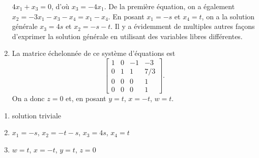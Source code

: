 \begin{exercice}
\begin{sol}
\begin{enumerate}
      $4x_1 + x_3 = 0$, d'où $x_3 = -4 x_1$. De la première équation,
      on a également $x_2 = -3 x_1 - x_3 - x_4 = x_1 - x_4$. En
      posant $x_1 = -s$ et $x_4 = t$, on a la solution générale $x_3
      = 4 s$ et $x_2 = -s - t$. Il y a évidemment de multiples autres
      façons d'exprimer la solution générale en utilisant des
      variables libres différentes.
    \item La matrice échelonnée de ce système d'équations est
      \begin{displaymath}
        \begin{bmatrix}
          1 & 0 & -1 &  -3 \\
          0 & 1 &  1 & 7/3 \\
          0 & 0 &  0 &   1 \\
          0 & 0 &  0 &   1
        \end{bmatrix}.
      \end{displaymath}
      On a donc $z = 0$ et, en posant $y = t$, $x = -t$, $w = t$.
    \end{enumerate}
  \end{sol}
  \begin{rep}
    \begin{enumerate}
    \item solution triviale
    \item $x_1 = -s$, $x_2 = -t - s$, $x_3 = 4s$, $x_4 = t$
    \item $w = t$, $x = -t$, $y = t$, $z = 0$
    \end{enumerate}
  \end{rep}
\end{exercice}

